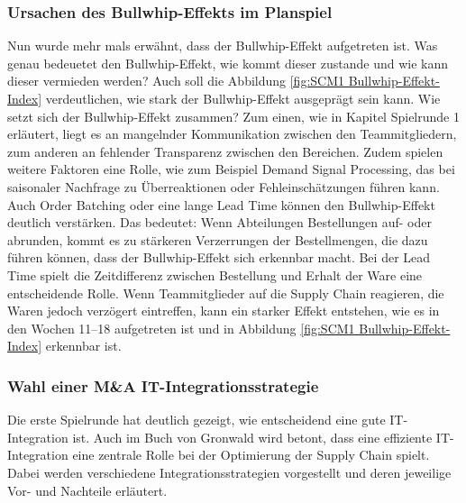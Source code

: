 \documentclass[a4paper,12pt]{article}
\begin{document}
\subsubsection{Ursachen des Bullwhip-Effekts im Planspiel}
Nun wurde mehr mals erwähnt, dass der Bullwhip-Effekt aufgetreten ist.
Was genau bedeuetet den Bullwhip-Effekt, wie kommt dieser zustande und wie kann dieser vermieden werden?
Auch soll die Abbildung \ref{fig:SCM1 Bullwhip-Effekt-Index} verdeutlichen, wie stark der Bullwhip-Effekt ausgeprägt sein kann.
Wie setzt sich der Bullwhip-Effekt zusammen? Zum einen, wie in Kapitel Spielrunde 1 erläutert, liegt es an mangelnder Kommunikation zwischen den Teammitgliedern,
 zum anderen an fehlender Transparenz zwischen den Bereichen.
Zudem spielen weitere Faktoren eine Rolle, wie zum Beispiel Demand Signal Processing, das bei saisonaler Nachfrage zu Überreaktionen oder Fehleinschätzungen führen kann.
Auch Order Batching oder eine lange Lead Time können den Bullwhip-Effekt deutlich verstärken.
Das bedeutet: Wenn Abteilungen Bestellungen auf- oder abrunden, kommt es zu stärkeren Verzerrungen der Bestellmengen, die dazu führen können, dass der Bullwhip-Effekt sich erkennbar macht.
Bei der Lead Time spielt die Zeitdifferenz zwischen Bestellung und Erhalt der Ware eine entscheidende Rolle.
Wenn Teammitglieder auf die Supply Chain reagieren, die Waren jedoch verzögert eintreffen, kann ein starker Effekt entstehen, wie es in den Wochen 11–18 aufgetreten ist und in Abbildung \ref{fig:SCM1 Bullwhip-Effekt-Index} erkennbar ist.

\subsubsection{Wahl einer M\&A IT-Integrationsstrategie}
Die erste Spielrunde hat deutlich gezeigt, wie entscheidend eine gute IT-Integration ist.
Auch im Buch von Gronwald wird betont, dass eine effiziente IT-Integration eine zentrale Rolle bei der Optimierung der Supply Chain spielt.
Dabei werden verschiedene Integrationsstrategien vorgestellt und deren jeweilige Vor- und Nachteile erläutert.
\end{document}
